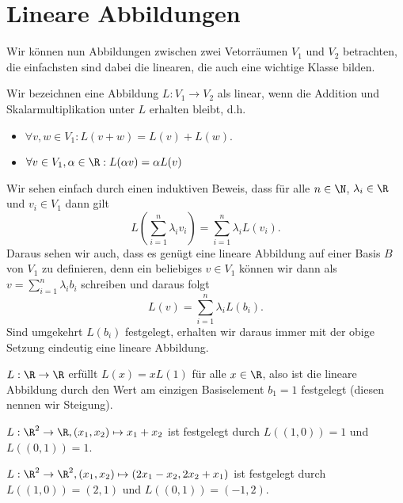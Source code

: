\section{Lineare Abbildungen}
\label{\detokenize{vektorraeume/LineareAbb:lineare-abbildungen}}\label{\detokenize{vektorraeume/LineareAbb::doc}}
Wir können nun Abbildungen zwischen zwei Vetorräumen \(V_1\) und \(V_2\) betrachten, die einfachsten sind dabei die linearen, die auch eine wichtige Klasse bilden.
\label{vektorraeume/LineareAbb:definition-0}
\begin{definition}{}{}



Wir bezeichnen eine Abbildung \(L: V_1 \rightarrow V_2\) als linear, wenn die Addition und Skalarmultiplikation unter \(L\) erhalten bleibt, d.h.
\begin{itemize}
\item {} 
\(\forall v,w \in V_1: L(v+w) = L(v) + L(w).\)

\item {} 
\(\forall v \in V_1, \alpha \in \R: L(\alpha v) = \alpha L(v)\)

\end{itemize}
\end{definition}

Wir sehen einfach durch einen induktiven Beweis, dass für alle \(n \in \N\), \(\lambda_i \in \R\) und \(v_i \in V_1\) dann gilt
\begin{equation*}
 L(\sum_{i=1}^n \lambda_i v_i) = \sum_{i=1}^n \lambda_i L(v_i) .
\end{equation*}
Daraus sehen wir auch, dass es genügt eine lineare Abbildung auf einer Basis \(B\) von \(V_1\) zu definieren, denn ein beliebiges \(v \in V_1\) können wir dann als \(v= \sum_{i=1}^n \lambda_i b_i\) schreiben und daraus folgt
\begin{equation*}
 L(v) = \sum_{i=1}^n \lambda_i L(b_i).
\end{equation*}
Sind umgekehrt \(L(b_i)\) festgelegt, erhalten wir daraus immer mit der obige Setzung eindeutig eine lineare Abbildung.
\label{vektorraeume/LineareAbb:example-1}
\begin{example}{}{}



\(L: \R \rightarrow \R\) erfüllt \(L(x) = x L(1)\) für alle \(x \in \R\), also ist die lineare Abbildung durch den Wert am einzigen Basiselement \(b_1=1\) festgelegt (diesen nennen wir Steigung).
\end{example}
\label{vektorraeume/LineareAbb:example-2}
\begin{example}{}{}



\(L: \R^2 \rightarrow \R, (x_1,x_2) \mapsto x_1 +x_2\) ist festgelegt durch \(L((1,0)) = 1\) und \(L((0,1))=1\).
\end{example}
\label{vektorraeume/LineareAbb:example-3}
\begin{example}{}{}



\(L: \R^2 \rightarrow \R^2, (x_1,x_2) \mapsto (2x_1-x_2,2x_2+x_1)\) ist festgelegt durch \(L((1,0)) = (2,1)\) und \(L((0,1))=(-1,2)\).
\end{example}

